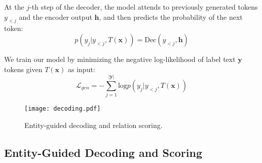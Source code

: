 \documentclass[11pt]{article}
\begin{document}
At the $j$-th step of the decoder, the model attends to previously generated tokens $y_{<j}$ and the encoder output $\mathbf{h}$, and then predicts the probability of the next token:
\begin{equation*}
p(y_j|y_{<j}, T(\boldsymbol{x}))=\textrm{Dec}(y_{<j}, \mathbf{h})
\end{equation*}

We train our model by minimizing the negative log-likelihood of label
text $\boldsymbol{y}$ tokens given $T(\boldsymbol{x})$ as input:
\begin{equation*}
\mathcal{L}_{gen}=-\sum_{j=1}^{|\boldsymbol{y}|}\textrm{log}p(y_j|y_{<j}, T(\boldsymbol{x}))
\end{equation*}

\begin{comment}
In addition, noting that entity types and relations have explicit knowledge constraints, we introduce structural constraints for the three sentinel tokens in the template to inject implicit correlations between entity types and relationships, as they are served as type tokens of head and tail entities and label verbalizations. To this end, we minimize a margin-based ranking criterion following the formula in \citet{DBLP:conf/nips/BordesUGWY13}.
\begin{equation*}
	\mathcal{L}_{str}=[\gamma + d(s_{h} + s_{r}, s_{t}) -  d(s_{h}^{'} + s_{r}, s_{t}^{'})]_{+} 
\end{equation*}
where $d(\cdot, \cdot)$ is the $L_{1}$-norm, $s_h$, $s_t$, and $s_r$ are embeddings of sentinel tokens \texttt{[X]}, \texttt{[Y]}, and \texttt{[Z]},  $[\cdot]_{+}$ denotes the positive part, $\gamma > 0$ is a margin hyperparameter, and $(s_{h}^{'}, s_{r}, s_{t}^{'})$ are negative samples. 

The overall optimization objective is $\mathcal{L}=\mathcal{L}_{gen} + \lambda \times \mathcal{L}_{str}$, where $\lambda$ is a hyperparameter to balance the two terms.
\end{comment}

\begin{figure}[t!]
\flushleft
\texttt{[image: decoding.pdf]}
\caption{Entity-guided decoding and relation scoring.}
\label{decoding} 
\end{figure}
\subsection{Entity-Guided Decoding  and Scoring}\label{4.4}
\end{document}
